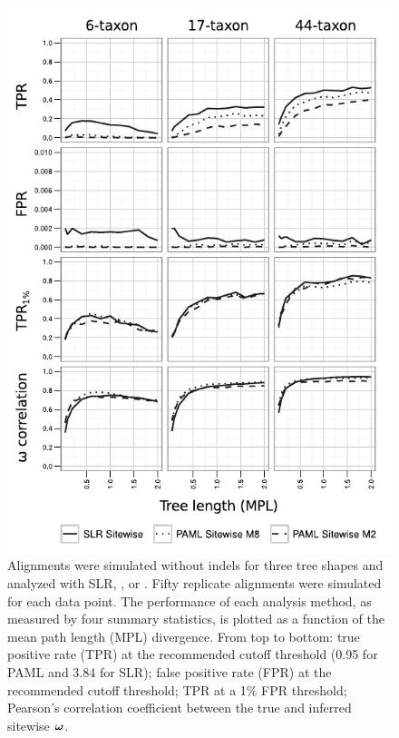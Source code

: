 \documentclass{article}
\begin{document}
\begin{figure}[t]
\begin{center}
\includegraphics[scale=1.25]{fig2.pdf}
\end{center}
\caption{Alignments were simulated without indels for three tree
  shapes and analyzed with SLR, \meight, or \mtwo. Fifty replicate
  alignments were simulated for each data point. The performance of
  each analysis method, as measured by four summary statistics, is
  plotted as a function of the mean path length (MPL) divergence. From
  top to bottom: true positive rate (TPR) at the recommended cutoff
  threshold (0.95 for PAML and 3.84 for SLR); false positive rate
  (FPR) at the recommended cutoff threshold; TPR at a 1\% FPR
  threshold; Pearson's correlation coefficient between the true and
  inferred sitewise $\bm{\omega}$.}
\label{fig_2}
\end{figure}
\end{document}
